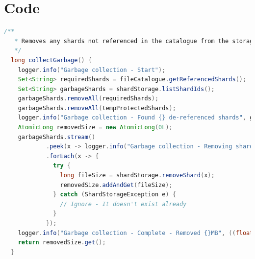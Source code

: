 \documentclass[11pt, a4paper, twocolumn, twoside]{report}
\begin{document}
\section{Code}

\begin{lstlisting}[language=Java, caption=Garbage Collection Implementation, label=lst:fileGC]
  /**
   * Removes any shards not referenced in the catalogue from the storage.
   */
  long collectGarbage() {
    logger.info("Garbage collection - Start");
    Set<String> requiredShards = fileCatalogue.getReferencedShards();
    Set<String> garbageShards = shardStorage.listShardIds();
    garbageShards.removeAll(requiredShards);
    garbageShards.removeAll(tempProtectedShards);
    logger.info("Garbage collection - Found {} de-referenced shards", garbageShards.size());
    AtomicLong removedSize = new AtomicLong(0L);
    garbageShards.stream()
            .peek(x -> logger.info("Garbage collection - Removing shard: [{}]", x))
            .forEach(x -> {
              try {
                long fileSize = shardStorage.removeShard(x);
                removedSize.addAndGet(fileSize);
              } catch (ShardStorageException e) {
                // Ignore - It doesn't exist already
              }
            });
    logger.info("Garbage collection - Complete - Removed {}MB", ((float) removedSize.get()) / (1024 * 1024));
    return removedSize.get();
  }
\end{lstlisting}
\end{document}
